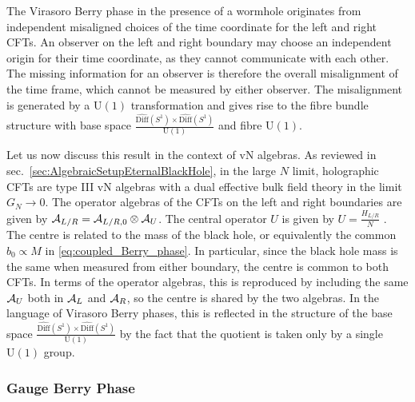 \documentclass[a4paper,11pt]{article}
\newcommand{\U}{\text{U}}
\newcommand{\1}{\mathds{1}}
\begin{document}
The Virasoro Berry phase in the presence of a wormhole originates from independent misaligned choices of the time coordinate for the left and right CFTs. An observer on the left and right boundary may choose an independent origin for their time coordinate, as they cannot communicate with each other. The missing information for an observer is therefore the overall misalignment of the time frame, which cannot be measured by either observer. The misalignment is generated by a $\U(1)$ transformation and gives rise to the fibre bundle structure with base space $\frac{\widehat{\text{Diff}}(S^1)\times\widehat{\text{Diff}}(S^1)}{\U(1)} $ and fibre $\U(1)$.

Let us now discuss this result in the context of vN algebras. As reviewed in sec.~\ref{sec:AlgebraicSetupEternalBlackHole}, in the large $N$ limit, holographic CFTs  are type III vN algebras with a dual effective bulk field theory in the limit $G_N\rightarrow 0$. The operator algebras of the CFTs on the left and right boundaries are given by ${\cal A}_{L/R}={\cal A}_{L/R,0}\otimes{\cal A}_U$. The central operator $U$ is given by $U=\frac{H_{L/R}}{N}$ \cite{Witten:2021unn}.
The centre is related to the mass of the black hole, or equivalently the common $b_0\propto M$ in \eqref{eq:coupled_Berry_phase}. In particular, since the black hole mass is the same when measured from either boundary, the centre is common to both CFTs. In terms of the operator algebras, this is reproduced by including the same ${\cal A}_U$ both in ${\cal A}_L$ and ${\cal A}_R$, so the centre is shared by the two algebras. In the language of Virasoro Berry phases, this is reflected in the structure of the base space $\frac{\widehat{\text{Diff}}(S^1)\times\widehat{\text{Diff}}(S^1)}{\U(1)}$ by the fact that the quotient is taken only by a single $\U(1)$ group.

\subsubsection{Gauge Berry Phase}
\label{sec:GaugeBerryPhase}
\end{document}
